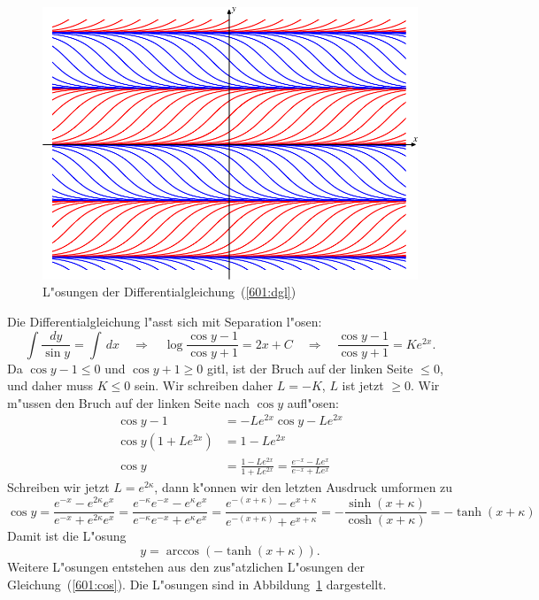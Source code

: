 \begin{diskussion}
\begin{figure}
\centering
\includegraphics{uebungsaufgaben/601-1.pdf}
\caption{L"osungen der Differentialgleichung~(\ref{601:dgl})
\label{601:bild}}
\end{figure}
Die Differentialgleichung l"asst sich mit Separation l"osen:
\[
\int \frac{dy}{\sin y}
=
\int\,dx
\quad\Rightarrow\quad
\log\frac{\cos y-1}{\cos y+1}
=
2x+C
\quad\Rightarrow\quad
\frac{\cos y-1}{\cos y+1}
=
Ke^{2x}.
\]
Da $\cos y-1\le 0$ und $\cos y +1\ge 0$ gitl, ist der Bruch auf der linken
Seite $\le 0$, und daher muss $K\le 0$ sein.
Wir schreiben daher $L=-K$, $L$ ist jetzt $\ge 0$.
Wir m"ussen den Bruch auf der linken Seite nach $\cos y$ aufl"osen:
\begin{align*}
\cos y - 1 &=-Le^{2x}\cos y -Le^{2x}
\\
\cos y(1+Le^{2x})
&=
1-Le^{2x}
\\
\cos y
&=
\frac{1-Le^{2x}}{1+Le^{2x}}
=
\frac{e^{-x}-Le^{x}}{e^{-x}+Le^x}
\end{align*}
Schreiben wir jetzt $L=e^{2\kappa}$, dann k"onnen wir den letzten
Ausdruck umformen zu
\begin{equation}
\cos y
=
\frac{e^{-x}-e^{2\kappa}e^x}{e^{-x}+e^{2\kappa}e^x}
=
\frac{e^{-\kappa}e^{-x}-e^{\kappa}e^x}{e^{-\kappa}e^{-x}+e^{\kappa}e^x}
=
\frac{e^{-(x+\kappa)}-e^{x+\kappa}}{e^{-(x+\kappa)}+e^{x + \kappa}}
=
-\frac{\sinh(x+\kappa)}{\cosh(x+\kappa)}
=
-\tanh(x+\kappa)
\label{601:cos}
\end{equation}
Damit ist die L"osung
\[
y=\arccos(-\tanh(x+\kappa)).
\]
Weitere L"osungen entstehen aus den zus"atzlichen L"osungen der
Gleichung~(\ref{601:cos}).
Die L"osungen sind in Abbildung~\ref{601:bild} dargestellt.
\end{diskussion}

